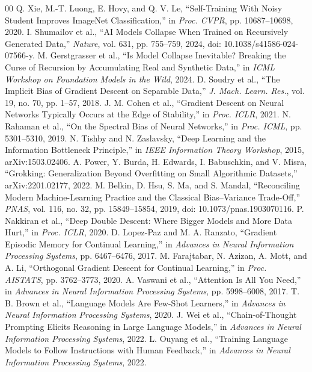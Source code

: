 \documentclass[conference,10pt]{IEEEtran}
\begin{document}
\begin{thebibliography}{00}
 Q. Xie, M.-T. Luong, E. Hovy, and Q. V. Le, ``Self-Training With Noisy Student Improves ImageNet Classification,'' in \emph{Proc. CVPR}, pp. 10687--10698, 2020.
 I. Shumailov et al., ``AI Models Collapse When Trained on Recursively Generated Data,'' \emph{Nature}, vol. 631, pp. 755--759, 2024, doi: 10.1038/s41586-024-07566-y.
 M. Gerstgrasser et al., ``Is Model Collapse Inevitable? Breaking the Curse of Recursion by Accumulating Real and Synthetic Data,'' in \emph{ICML Workshop on Foundation Models in the Wild}, 2024.
 D. Soudry et al., ``The Implicit Bias of Gradient Descent on Separable Data,'' \emph{J. Mach. Learn. Res.}, vol. 19, no. 70, pp. 1--57, 2018.
 J. M. Cohen et al., ``Gradient Descent on Neural Networks Typically Occurs at the Edge of Stability,'' in \emph{Proc. ICLR}, 2021.
 N. Rahaman et al., ``On the Spectral Bias of Neural Networks,'' in \emph{Proc. ICML}, pp. 5301--5310, 2019.
 N. Tishby and N. Zaslavsky, ``Deep Learning and the Information Bottleneck Principle,'' in \emph{IEEE Information Theory Workshop}, 2015, arXiv:1503.02406.
 A. Power, Y. Burda, H. Edwards, I. Babuschkin, and V. Misra, ``Grokking: Generalization Beyond Overfitting on Small Algorithmic Datasets,'' arXiv:2201.02177, 2022.
 M. Belkin, D. Hsu, S. Ma, and S. Mandal, ``Reconciling Modern Machine-Learning Practice and the Classical Bias--Variance Trade-Off,'' \emph{PNAS}, vol. 116, no. 32, pp. 15849--15854, 2019, doi: 10.1073/pnas.1903070116.
 P. Nakkiran et al., ``Deep Double Descent: Where Bigger Models and More Data Hurt,'' in \emph{Proc. ICLR}, 2020.
 D. Lopez-Paz and M. A. Ranzato, ``Gradient Episodic Memory for Continual Learning,'' in \emph{Advances in Neural Information Processing Systems}, pp. 6467--6476, 2017.
 M. Farajtabar, N. Azizan, A. Mott, and A. Li, ``Orthogonal Gradient Descent for Continual Learning,'' in \emph{Proc. AISTATS}, pp. 3762--3773, 2020.
 A. Vaswani et al., ``Attention Is All You Need,'' in \emph{Advances in Neural Information Processing Systems}, pp. 5998--6008, 2017.
 T. B. Brown et al., ``Language Models Are Few-Shot Learners,'' in \emph{Advances in Neural Information Processing Systems}, 2020.
 J. Wei et al., ``Chain-of-Thought Prompting Elicits Reasoning in Large Language Models,'' in \emph{Advances in Neural Information Processing Systems}, 2022.
 L. Ouyang et al., ``Training Language Models to Follow Instructions with Human Feedback,'' in \emph{Advances in Neural Information Processing Systems}, 2022.
\end{thebibliography}
\endgroup
\end{document}
